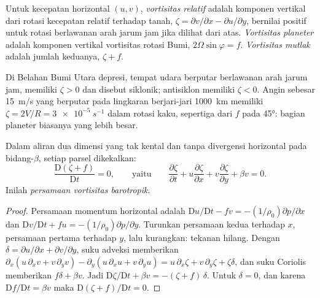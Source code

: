 \begin{definition}\label{def:b3:atmospheric-dynamics:vorticity-kinds}
Untuk kecepatan horizontal $(u, v)$, \emph{vortisitas
relatif} adalah komponen vertikal dari rotasi
kecepatan relatif terhadap tanah, $\zeta = \partial v/\partial x -
\partial u/\partial y$, bernilai positif untuk rotasi berlawanan arah jarum jam jika dilihat dari atas.
\emph{Vortisitas planeter} adalah komponen vertikal
vortisitas rotasi Bumi, $2\Omega\sin\varphi =
f$. \emph{Vortisitas mutlak} adalah jumlah keduanya,
$\zeta + f$.
\end{definition}

Di Belahan Bumi Utara depresi, tempat udara berputar berlawanan arah jarum jam,
memiliki $\zeta > 0$ dan disebut siklonik; antisiklon memiliki $\zeta < 0$. Angin
sebesar \qty{15}{m/s} yang berputar pada lingkaran berjari-jari \qty{1000}{km} memiliki $\zeta =
2V/R = \qty{3e-5}{s^{-1}}$ dalam rotasi kaku, sepertiga dari $f$ pada \ang{45}:
bagian planeter biasanya yang lebih besar.

\begin{theorem}\label{thm:b3:atmospheric-dynamics:bve}
Dalam aliran dua dimensi yang tak kental dan tanpa divergensi horizontal pada
bidang-$\beta$,  setiap parsel dikekalkan:
\[
\frac{\mathrm D(\zeta + f)}{\mathrm Dt} = 0 ,
\qquad\text{yaitu}\qquad
\frac{\partial\zeta}{\partial t} + u\frac{\partial\zeta}{\partial x} + v\frac{\partial\zeta}{\partial y} + \beta v = 0 .
\]
Inilah \emph{persamaan vortisitas barotropik}.
\end{theorem}

\begin{proof}
Persamaan momentum horizontal adalah $\mathrm Du/\mathrm Dt - fv =
-(1/\rho_0)\partial p/\partial x$ dan $\mathrm Dv/\mathrm Dt + fu =
-(1/\rho_0)\partial p/\partial y$. Turunkan persamaan kedua terhadap
$x$, persamaan pertama terhadap $y$, lalu kurangkan: tekanan hilang.
Dengan $\delta = \partial u/\partial x + \partial v/\partial y$, suku
adveksi memberikan $\partial_x(u\,\partial_xv + v\,\partial_yv) -
\partial_y(u\,\partial_xu + v\,\partial_yu) = u\,\partial_x\zeta +
v\,\partial_y\zeta + \zeta\delta$, dan suku Coriolis memberikan $f\delta + \beta
v$. Jadi $\mathrm D\zeta/\mathrm Dt + \beta v = -(\zeta + f)\,\delta$. Untuk
$\delta = 0$, dan karena $\mathrm Df/\mathrm Dt = \beta v$ maka $\mathrm D(\zeta +
f)/\mathrm Dt = 0$.
\end{proof}

